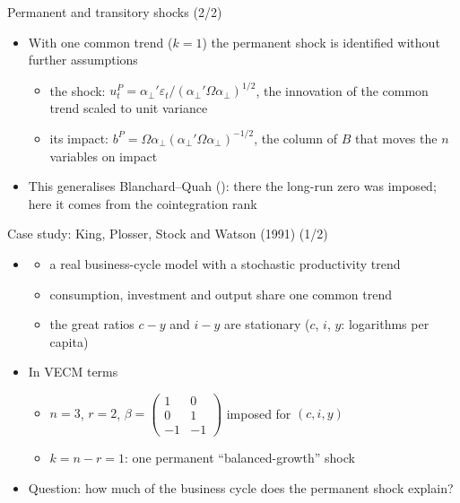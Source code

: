 \begin{frame}{Permanent and transitory shocks (2/2)}
\itemsize{\small}
\begin{itemize}
    \item With one common trend ($k = 1$) the permanent shock is identified without further assumptions
    \begin{itemize}
        \item the shock: $u_t^P = \alpha_\perp'\varepsilon_t/(\alpha_\perp'\Omega\alpha_\perp)^{1/2}$, the innovation of the common trend scaled to unit variance
        \item its impact: $b^P = \Omega\alpha_\perp(\alpha_\perp'\Omega\alpha_\perp)^{-1/2}$, the column of $B$ that moves the $n$ variables on impact
    \end{itemize}
    \item This generalises Blanchard--Quah (): there the long-run zero was imposed; here it comes from the cointegration rank
\end{itemize}
\end{frame}

\begin{frame}{Case study: King, Plosser, Stock and Watson (1991) (1/2)}
\itemsize{\small}
\begin{itemize}
    \item {}
    \begin{itemize}
        \item a real business-cycle model with a stochastic productivity trend
        \item consumption, investment and output share one common trend
        \item the great ratios $c - y$ and $i - y$ are stationary ($c$, $i$, $y$: logarithms per capita)
    \end{itemize}
    \item In VECM terms
    \begin{itemize}
        \item $n = 3$, $r = 2$, $\beta = \begin{pmatrix}1 & 0\\ 0 & 1\\ -1 & -1\end{pmatrix}$ imposed for $(c, i, y)$
        \item $k = n - r = 1$: one permanent ``balanced-growth'' shock
    \end{itemize}
    \item Question: how much of the business cycle does the permanent shock explain?
\end{itemize}
\end{frame}


